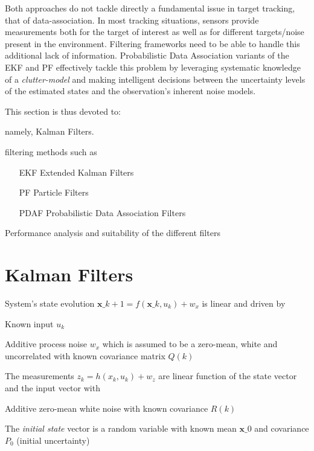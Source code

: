 Both approaches do not tackle directly a fundamental issue in target tracking, that of data-association. In most tracking situations, sensors provide measurements both for the target of interest as well as for different targets/noise present in the environment. Filtering frameworks need to be able to handle this additional lack of information. Probabilistic Data Association   variants of the EKF and PF effectively tackle this problem by leveraging systematic knowledge of a \emph{clutter-model} and making intelligent decisions between the uncertainty levels of the estimated states and the observation's inherent noise models.

This section is thus devoted to:

\begin{description}
	\item[Linear filters] namely, Kalman Filters.
	\item [Non-linear filters] filtering methods such as
	\begin{itemize}
		\item[EKF] Extended Kalman Filters
		\item[PF]Particle Filters
		\item[PDAF] Probabilistic Data Association Filters 
	\end{itemize}
	\item Performance analysis and suitability of the different filters
\end{description}


\section{Kalman Filters}

\begin{description}
	\item System's state evolution $\mathbf{x}\_{k+1} = f(\mathbf{x}\_k,u_k) + w_{\textit{x}}$ is linear and driven by
	\begin{description}
		\item Known input $u_k$
		\item Additive process noise $w_{\textit{x}}$ which is assumed to be a zero-mean, white and uncorrelated with known covariance matrix $Q(k)$
	\end{description}
	\item The measurements $ z_k = h(x_k,u_k) + w_z $  are linear function of the state vector and the input vector with
	\begin{description}
		\item Additive zero-mean white noise with known covariance $R(k)$
	\end{description}
	\item The \emph{initial state} vector is a random variable with known mean $\mathbf{x}\_0$ and covariance $P_0$ (initial uncertainty)
\end{description}


